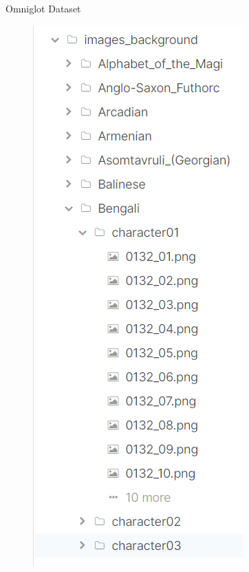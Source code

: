 \begin{frame}{Omniglot Dataset}
\begin{minipage}{0.2\textwidth}
\begin{figure}
    \includegraphics[scale=0.25]{images/Omniglot Dataset.png}
\end{figure}
\end{minipage}

\end{frame}

